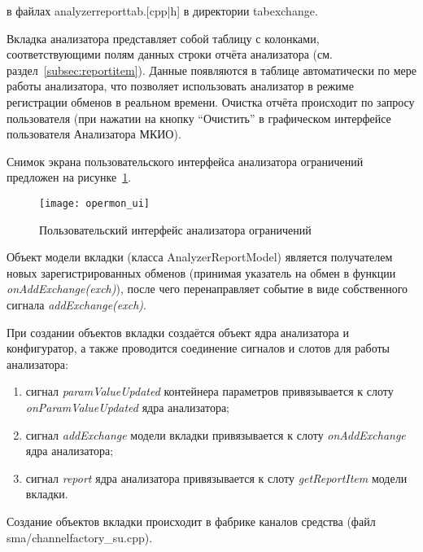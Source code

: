 в файлах analyzerreporttab.[cpp|h] в директории tabexchange.

Вкладка анализатора представляет собой таблицу с колонками, соответствующими 
полям данных строки отчёта анализатора (см. раздел~\ref{subsec:reportitem}). 
Данные появляются в таблице автоматически по мере работы анализатора, что 
позволяет использовать анализатор в режиме регистрации обменов в реальном 
времени. Очистка отчёта происходит по запросу пользователя (при нажатии на 
кнопку ``Очистить'' в графическом интерфейсе пользователя Анализатора МКИО).

Снимок экрана пользовательского интерфейса анализатора ограничений предложен на 
рисунке~\ref{fig:opermon_ui}.

\begin{figure}[ht]
 \centering
 \texttt{[image: opermon\_ui]}
 \caption{Пользовательский интерфейс анализатора ограничений}
 \label{fig:opermon_ui}
\end{figure}

Объект модели вкладки (класса AnalyzerReportModel) является получателем новых 
зарегистрированных обменов (принимая указатель на обмен в функции 
\textit{onAddExchange(exch)}), после чего перенаправляет событие в 
виде собственного сигнала \textit{addExchange(exch)}.

При создании объектов вкладки создаётся объект ядра анализатора и конфигуратор, 
а также проводится соединение сигналов и слотов для работы анализатора:

\begin{enumerate}
 \item сигнал \textit{paramValueUpdated} контейнера параметров привязывается к 
слоту \textit{onParamValueUpdated} ядра анализатора;
 \item сигнал \textit{addExchange} модели вкладки привязывается к слоту 
\textit{onAddExchange} ядра анализатора;
 \item сигнал \textit{report} ядра анализатора привязывается к слоту 
\textit{getReportItem} модели вкладки.
\end{enumerate}

Создание объектов вкладки происходит в фабрике каналов средства (файл 
sma/channelfactory\_su.cpp).
